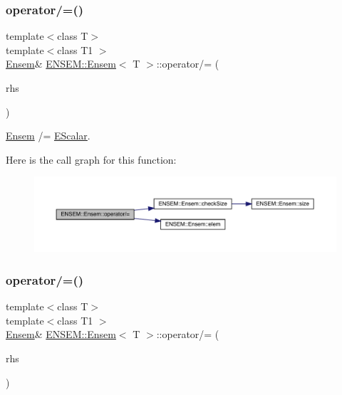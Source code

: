 \subsubsection{\texorpdfstring{operator/=()}{operator/=()}\hspace{0.1cm}{\footnotesize\ttfamily [1/4]}}
{\footnotesize\ttfamily template$<$class T$>$ \\
template$<$class T1 $>$ \\
\mbox{\hyperlink{classENSEM_1_1Ensem}{Ensem}}\& \mbox{\hyperlink{classENSEM_1_1Ensem}{E\+N\+S\+E\+M\+::\+Ensem}}$<$ T $>$\+::operator/= (\begin{DoxyParamCaption}\item[{const \mbox{\hyperlink{classENSEM_1_1EScalar}{E\+Scalar}}$<$ T1 $>$ \&}]{rhs }\end{DoxyParamCaption})\hspace{0.3cm}{\ttfamily [inline]}}



\mbox{\hyperlink{classENSEM_1_1Ensem}{Ensem}} /= \mbox{\hyperlink{classENSEM_1_1EScalar}{E\+Scalar}}. 

Here is the call graph for this function\+:
\nopagebreak
\begin{figure}[H]
\begin{center}
\leavevmode
\includegraphics[width=350pt]{d7/d3e/classENSEM_1_1Ensem_a32bf70c0844ce98695151457bf9df018_cgraph}
\end{center}
\end{figure}
\mbox{\label{classENSEM_1_1Ensem_a32bf70c0844ce98695151457bf9df018}} 
\subsubsection{\texorpdfstring{operator/=()}{operator/=()}\hspace{0.1cm}{\footnotesize\ttfamily [2/4]}}
{\footnotesize\ttfamily template$<$class T$>$ \\
template$<$class T1 $>$ \\
\mbox{\hyperlink{classENSEM_1_1Ensem}{Ensem}}\& \mbox{\hyperlink{classENSEM_1_1Ensem}{E\+N\+S\+E\+M\+::\+Ensem}}$<$ T $>$\+::operator/= (\begin{DoxyParamCaption}\item[{const \mbox{\hyperlink{classENSEM_1_1EScalar}{E\+Scalar}}$<$ T1 $>$ \&}]{rhs }\end{DoxyParamCaption})\hspace{0.3cm}{\ttfamily [inline]}}



